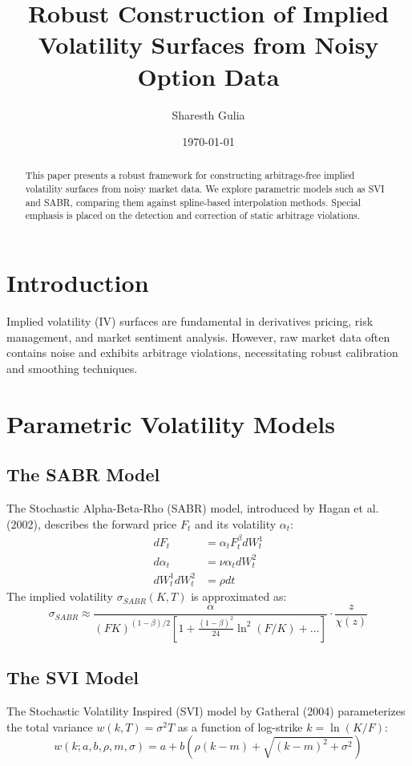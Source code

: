 \documentclass{article}
\title{Robust Construction of Implied Volatility Surfaces from Noisy Option Data}
\author{Sharesth Gulia}
\date{\today}
\begin{document}
\maketitle

\begin{abstract}
This paper presents a robust framework for constructing arbitrage-free implied volatility surfaces from noisy market data. We explore parametric models such as SVI and SABR, comparing them against spline-based interpolation methods. Special emphasis is placed on the detection and correction of static arbitrage violations.
\end{abstract}

\section{Introduction}
Implied volatility (IV) surfaces are fundamental in derivatives pricing, risk management, and market sentiment analysis. However, raw market data often contains noise and exhibits arbitrage violations, necessitating robust calibration and smoothing techniques.

\section{Parametric Volatility Models}

\subsection{The SABR Model}
The Stochastic Alpha-Beta-Rho (SABR) model, introduced by Hagan et al. (2002), describes the forward price $F_t$ and its volatility $\alpha_t$:
\begin{align}
dF_t &= \alpha_t F_t^\beta dW_t^1 \\
d\alpha_t &= \nu \alpha_t dW_t^2 \\
dW_t^1 dW_t^2 &= \rho dt
\end{align}
The implied volatility $\sigma_{SABR}(K, T)$ is approximated as:
\begin{equation}
\sigma_{SABR} \approx \frac{\alpha}{(FK)^{(1-\beta)/2} [1 + \frac{(1-\beta)^2}{24}\ln^2(F/K) + \dots]} \cdot \frac{z}{\chi(z)}
\end{equation}

\subsection{The SVI Model}
The Stochastic Volatility Inspired (SVI) model by Gatheral (2004) parameterizes the total variance $w(k, T) = \sigma^2 T$ as a function of log-strike $k = \ln(K/F)$:
\begin{equation}
w(k; a, b, \rho, m, \sigma) = a + b \left( \rho(k-m) + \sqrt{(k-m)^2 + \sigma^2} \right)
\end{equation}
\end{document}
